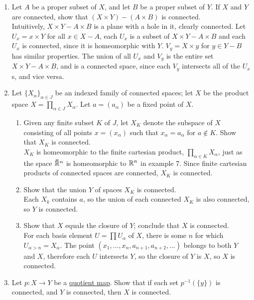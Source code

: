 \documentclass[12pt,letterpaper]{article}
\begin{document}
\begin{enumerate}
  \item Let $A$ be a proper subset of $X$, and let $B$ be a proper subset of $Y$. If $X$ and $Y$ are connected, show that $(X\times Y) - (A\times B)$ is connected. \\
  Intuitively, $X\times Y - A\times B$ is a plane with a hole in it, clearly connected. %
  Let $U_x=x\times Y$ for all $x\in X-A$, each $U_x$ is a subset of $X\times Y - A\times B$ and each $U_x$ is connected, since it is homeomorphic with $Y$. $V_y=X\times y$ for $y\in Y-B$ has similar properties. The union of all $U_x$ and $V_y$ is the entire set $X\times Y-A\times B$, and is a connected space, since each $V_y$ intersects all of the $U_x$s, and vice versa. 
  \item Let $\{X_\alpha\}_{\alpha\in J}$ be an indexed family of connected spaces; let $X$ be the product space $X=\prod_{\alpha\in J}X_\alpha$. Let $a=(a_\alpha)$ be a fixed point of $X$.
  \begin{enumerate}
    \item Given any finite subset $K$ of $J$, let $X_K$ denote the subspace of $X$ consisting of all points $x=(x_\alpha)$ such that $x_\alpha=a_\alpha$ for $a\not\in K$. Show that $X_K$ is connected. \\
    $X_K$ is homeomorphic to the finite cartesian product, $\prod_{\alpha\in K}X_\alpha$, just as the space $\bar{\R}^n$ is homeomorphic to $\mathbb{R}^n$ in example 7. Since finite cartesian products of connected spaces are connected, $X_K$ is connected.
    \item Show that the union $Y$ of spaces $X_K$ is connected. \\
    Each $X_k$ contains $a$, so the union of each connected $X_K$ is also connected, so $Y$ is connected.
    \item Show that $X$ equals the closure of $Y$; conclude that $X$ is connected.\\
    For each basis element $U=\prod U_\alpha$ of $X$, there is some $n$ for which $U_{\alpha>n}=X_\alpha$. The point $(x_1,\dots,x_n,a_{n+1},a_{n+2},\dots)$ belongs to both $Y$ and $X$, therefore each $U$ intersects $Y$, so the closure of $Y$ is $X$, so $X$ is connected.
  \end{enumerate}
  \item Let $p:X\rightarrow Y$ be a \hyperref[dfn:quotientMap]{quotient map}. Show that if each set $p^{-1}(\{y\})$ is connected, and $Y$ is connected, then $X$ is connected. \\

\end{enumerate}
\end{document}
